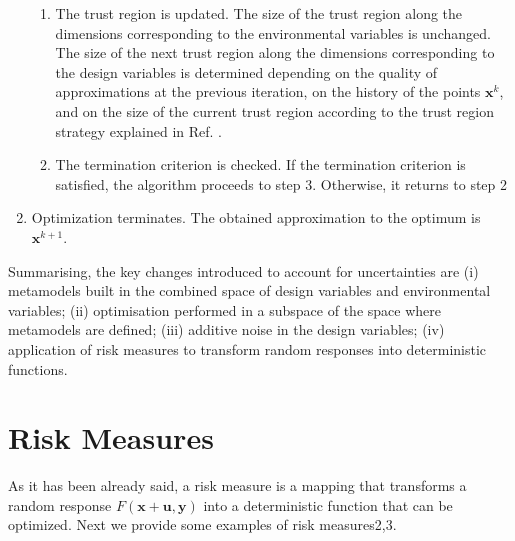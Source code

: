 \documentclass[10pt,twocolumn,a4paper]{article}
\begin{document}
\begin{enumerate}
\begin{enumerate}[label=(\alph*)]
    \item The trust region is updated. The size of the trust region along the dimensions corresponding to the environmental variables is unchanged. The size of the next trust region along the dimensions corresponding to the design variables is determined depending on the quality of approximations at the previous iteration, on the history of the points $\pmb x^k$, and on the size of the current trust region according to the trust region strategy explained in Ref. \cite{KeulenToropovMarkine1996}.
    \item The termination criterion is checked. If the termination criterion is satisfied, the algorithm proceeds to step 3. Otherwise, it returns to step 2
  \end{enumerate}
  \item Optimization terminates. The obtained approximation to the optimum is $\pmb x^{k+1}$.
\end{enumerate}

Summarising, the key changes introduced to account for uncertainties are (i) metamodels built in the combined space of design variables and environmental variables; (ii) optimisation performed in a subspace of the space where metamodels are defined; (iii) additive noise in the design variables; (iv) application of risk measures to transform random responses into deterministic functions.

\section{Risk Measures}
\label{sec:risk}

As it has been already said, a risk measure is a mapping that transforms a random response $F(\pmb x+ \pmb u,\pmb y)$  into a deterministic function that can be optimized. Next we provide some examples of risk measures2,3.
\end{document}
